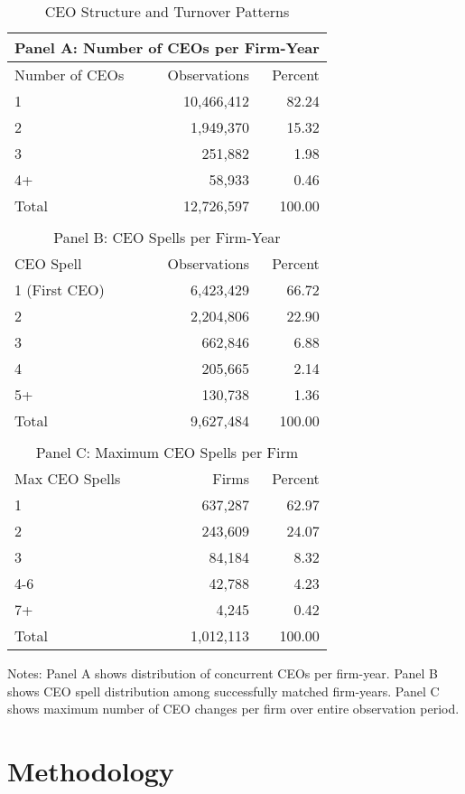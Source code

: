 \documentclass[11pt,a4paper]{article}
\begin{document}
\begin{table}[htbp]
\centering
\caption{CEO Structure and Turnover Patterns}
\label{tab:ceo_structure}
\begin{tabular}{lrr}
\toprule
\multicolumn{3}{c}{Panel A: Number of CEOs per Firm-Year} \\
\midrule
Number of CEOs & Observations & Percent \\
\midrule
1 & 10,466,412 & 82.24 \\
2 & 1,949,370 & 15.32 \\
3 & 251,882 & 1.98 \\
4+ & 58,933 & 0.46 \\
\midrule
Total & 12,726,597 & 100.00 \\
\\[0.5em]
\multicolumn{3}{c}{Panel B: CEO Spells per Firm-Year} \\
\midrule
CEO Spell & Observations & Percent \\
\midrule
1 (First CEO) & 6,423,429 & 66.72 \\
2 & 2,204,806 & 22.90 \\
3 & 662,846 & 6.88 \\
4 & 205,665 & 2.14 \\
5+ & 130,738 & 1.36 \\
\midrule
Total & 9,627,484 & 100.00 \\
\\[0.5em]
\multicolumn{3}{c}{Panel C: Maximum CEO Spells per Firm} \\
\midrule
Max CEO Spells & Firms & Percent \\
\midrule
1 & 637,287 & 62.97 \\
2 & 243,609 & 24.07 \\
3 & 84,184 & 8.32 \\
4-6 & 42,788 & 4.23 \\
7+ & 4,245 & 0.42 \\
\midrule
Total & 1,012,113 & 100.00 \\
\bottomrule
\end{tabular}
\footnotesize
Notes: Panel A shows distribution of concurrent CEOs per firm-year. Panel B shows CEO spell distribution among successfully matched firm-years. Panel C shows maximum number of CEO changes per firm over entire observation period.
\end{table}

\section{Methodology}
\end{document}
